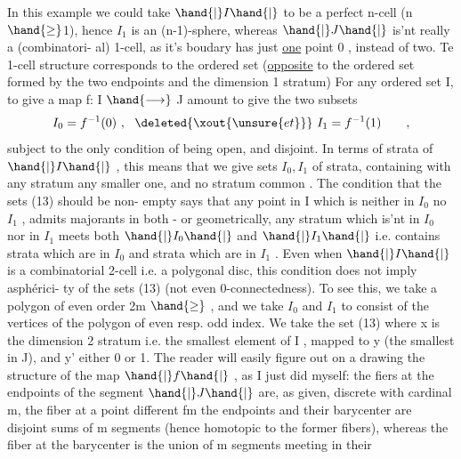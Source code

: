 In this example we could take $\hand{|}I\hand{|}$ to be a perfect n-cell (n$\hand{\geq}$1),
hence  $I_1$  is an (n-1)-sphere,  whereas $\hand{|}J\hand{|}$ is'nt really a (combinatori-%
al) 1-cell,  as it's boudary has just \uline{one} point 0 ,  instead of two.
Te 1-cell structure corresponds to the ordered set (\uline{opposite} to the
ordered set formed by the two endpoints and the dimension 1 stratum)
\diagram{\[ J = \begin{tikzcd}[row sep=small, column sep=small] \& \over{y}{y} \ar[color=blue,dl] \ar[color=blue,dr] \& \\ \over[typed]{0}{0} \& \& 1 \end{tikzcd} \quad . \]}
For any ordered set I,  to give a map  f: I $\hand{\longrightarrow}$ J  amount to give
the two subsets
\[ I_0 = f^{-1}(0) \ , \ \ \deleted{\xout{\unsure{et}}}\ I_1 = f^{-1}(1) \qquad , \]
subject to the only condition of being open,  and disjoint.  In terms
of strata of $\hand{|}I\hand{|}$ ,  this means that we give  sets $I_0,I_1$ of strata,
containing with any stratum any smaller one,  and  no stratum 
common .  The condition that the sets (13) should be non-%
empty says that any point in I which is neither in $I_0$ no $I_1$ , admits
majorants in both  -  or geometrically,  any stratum which is'nt in
$I_0$ nor in $I_1$ meets both $\hand{|}I_0\hand{|}$ and $\hand{|}I_1\hand{|}$ i.e. contains strata which are
in $I_0$ and strata which are in $I_1$ .   Even when $\hand{|}I\hand{|}$ is a combinatorial
2-cell i.e. a polygonal disc,  this condition does not imply asphérici-%
ty of the sets (13) (not even 0-connectedness).  To see this,  we take
a polygon of even order 2m $\hand{\geq}$ ,  and we take  $I_0$ and $I_1$ to consist
of the vertices of the polygon of even resp. odd index.  We take the
set (13) where x is the dimension 2 stratum  i.e. the  smallest
element of I ,  mapped to y (the smallest in J),  and y' either 0 or 1.
The reader will easily figure out on a drawing the structure of the
map $\hand{|}f\hand{|}$ ,  as I just did myself:  the fiers at the endpoints of the
segment $\hand{|}J\hand{|}$ are,  as given,  discrete with cardinal m,  the fiber at
a point different fm the endpoints and  their barycenter are disjoint
sums of m segments (hence homotopic to the former fibers),  whereas
the fiber at the barycenter is the union of m segments meeting in their


